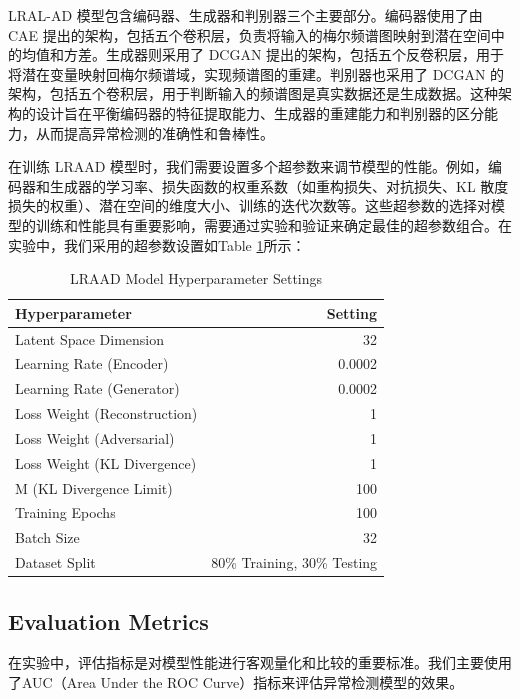 \documentclass{article}
\begin{document}
LRAL-AD 模型包含编码器、生成器和判别器三个主要部分。编码器使用了由 CAE 提出的架构，包括五个卷积层，负责将输入的梅尔频谱图映射到潜在空间中的均值和方差。生成器则采用了 DCGAN 提出的架构，包括五个反卷积层，用于将潜在变量映射回梅尔频谱域，实现频谱图的重建。判别器也采用了 DCGAN 的架构，包括五个卷积层，用于判断输入的频谱图是真实数据还是生成数据。这种架构的设计旨在平衡编码器的特征提取能力、生成器的重建能力和判别器的区分能力，从而提高异常检测的准确性和鲁棒性。

在训练 LRAAD 模型时，我们需要设置多个超参数来调节模型的性能。例如，编码器和生成器的学习率、损失函数的权重系数（如重构损失、对抗损失、KL 散度损失的权重）、潜在空间的维度大小、训练的迭代次数等。这些超参数的选择对模型的训练和性能具有重要影响，需要通过实验和验证来确定最佳的超参数组合。在实验中，我们采用的超参数设置如Table \ref{tab:params}所示：


\begin{table}[htbp]
    \centering
    \caption{LRAAD Model Hyperparameter Settings}
    \label{tab:params}
    \begin{tabular}{lr}
        \toprule
        \textbf{Hyperparameter} & \textbf{Setting} \\
        \midrule
        Latent Space Dimension & 32 \\
        Learning Rate (Encoder) & 0.0002 \\
        Learning Rate (Generator) & 0.0002 \\
        Loss Weight (Reconstruction) & 1 \\
        Loss Weight (Adversarial) & 1 \\
        Loss Weight (KL Divergence) & 1 \\
        M (KL Divergence Limit) & 100 \\
        Training Epochs & 100 \\
        Batch Size & 32 \\
        Dataset Split & 80\% Training, 30\% Testing \\
        \bottomrule
    \end{tabular}
\end{table}


\subsection{Evaluation Metrics}
在实验中，评估指标是对模型性能进行客观量化和比较的重要标准。我们主要使用了AUC（Area Under the ROC Curve）指标来评估异常检测模型的效果。
\end{document}
